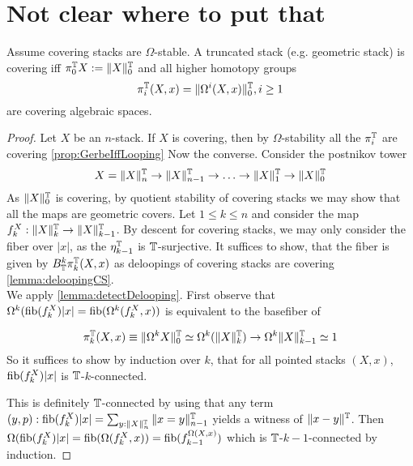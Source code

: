 \documentclass{article}
\begin{document}
\section{Not clear where to put that}
\begin{prop}{\label{prop:htpyGroups}}
	Assume covering stacks are $\Omega$-stable.
	A truncated stack (e.g. geometric stack) is covering iff $\pi_0^{\mathbb{T}} X := \|X\|_0^{\mathbb{T}}$ and all higher homotopy groups 
	\[
	\pi_i^{\mathbb{T}}(X,x) = \|\Omega^i (X , x)\|_0^{\mathbb{T}} , i \ge 1
	\]
	are covering algebraic spaces.
\end{prop}
\begin{proof}
	Let $X$ be an $n$-stack.
	If $X$ is covering, then by $\Omega$-stability all the $\pi_i^{\mathbb{T}}$ are covering \ref{prop:GerbeIffLooping} Now the converse.
	Consider the postnikov tower
	\[
	X = \|X\|_n^{\mathbb{T}} \to \|X\|_{n-1}^{\mathbb{T}} \to \hdots \to \|X\|_1^{\mathbb{T}} \to \|X\|_0^{\mathbb{T}} 
	\]
	As $\|X\|_0^{\mathbb{T}}$ is covering, by quotient stability of covering stacks we may show that all the maps are geometric covers. 
	Let $1 \le k \le n$ and consider the map $f_k^X : \|X\|_{k}^{\mathbb{T}} \to \|X\|_{k-1}^{\mathbb{T}}$. By descent for covering stacks, we may only consider the fiber over $|x|$, as the $\eta_{k-1}^{\mathbb{T}}$ is $\mathbb{T}$-surjective. 
	It suffices to show, that the fiber is given by $B_{\mathbb{T}}^k \pi^{\mathbb{T}}_k(X,x)$ as deloopings of covering stacks are covering \ref{lemma:deloopingCS}.\\	
	We apply \ref{lemma:detectDelooping}.
	First observe that $\Omega^k (\operatorname{fib}(f_k^X) |x| = \operatorname{fib} (\Omega^k (f_k^X , x))$ is equivalent to the basefiber of
	
	\[
	\pi_k^{\mathbb{T}}(X,x) \equiv \|\Omega^k X \|_0^{\mathbb{T}} \simeq \Omega^k(\|X\|_k^{\mathbb{T}}) \to \Omega^k \|X\|_{k-1}^{\mathbb{T}} \simeq 1
	\]
	So it suffices to show by induction over $k$, that for all pointed stacks $(X,x)$, $\operatorname{fib}(f_k^X) |x|$ is $\mathbb{T}$-$k$-connected.
	
	This is definitely $\mathbb{T}$-connected by using that any term $(y, p) : \operatorname{fib}(f_k^X) |x| = \sum_{y : \|X\|_n^{\mathbb{T}}} \|x = y\|_{n-1}^{\mathbb{T}}$ yields a witness of $\|x - y\|^{\mathbb{T}}$. Then $\Omega (\operatorname{fib}(f_k^X) |x| = \operatorname{fib} (\Omega (f_k^X , x)) = \operatorname{fib} (f_{k-1}^{\Omega (X , x)})$ which is $\mathbb{T}$-$k-1$-connected by induction.
\end{proof}

\printbibliography
\end{document}
